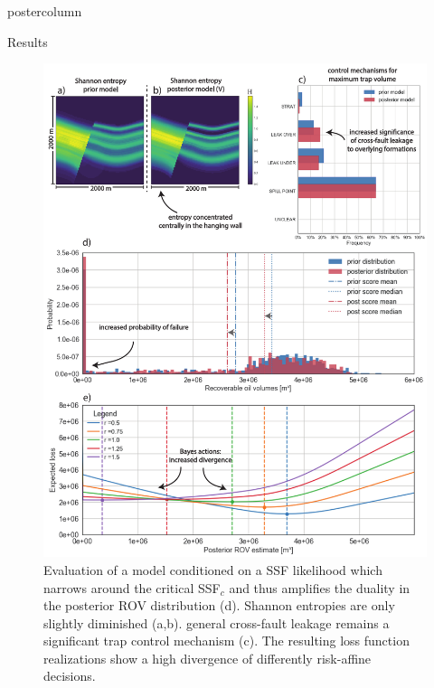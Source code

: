 \documentclass{beamer}
\begin{document}
\begin{frame}
\begin{columns}
\begin{column}{.618\textwidth}
\begin{beamercolorbox}[center]{postercolumn}
\begin{minipage}{.98\textwidth}
{\begin{myblock}{Results}
\begin{figure}
\begin{minipage}{0.98\textwidth}
\begin{minipage}[t]{0.5\textwidth}
				\centering\includegraphics[width=1\textwidth]{figures/ML5}
				\caption{Evaluation of a model conditioned on a SSF likelihood which narrows around the critical SSF$_c$ and thus amplifies the duality in the posterior ROV distribution (d). Shannon entropies are only slightly diminished (a,b). general cross-fault leakage remains a significant trap control mechanism (c). The resulting loss function realizations show a high divergence of differently risk-affine decisions.}
				\label{fig:ML5}
			\end{minipage}	
		\end{minipage}
	\end{figure}
	\vspace{0.2em}
	

\end{myblock}}
\end{minipage}
\end{beamercolorbox}
\end{column}
\end{columns}
\end{frame}
\end{document}
